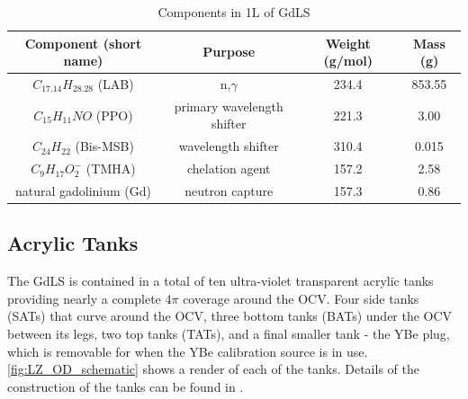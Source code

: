 \begin{table}
    \centering
    \begin{tabular}{c | c | c | c}
    \hline
    {Component (short name)} & {Purpose} & {Weight (g/mol)} & {Mass (g)} \\ \hline
    $C_{17.14}H_{28.28}$ (LAB) & n,$\gamma$ & 234.4  & 853.55 \\
    $C_{15}H_{11}NO$ (PPO) & primary wavelength shifter & 221.3 & 3.00 \\
    $C_{24}H_{22}$ (Bis-MSB) & wavelength shifter & 310.4 & 0.015 \\
    $C_{9}H_{17}O^{-}_{2}$ (TMHA) & chelation agent & 157.2 & 2.58 \\
    natural gadolinium (Gd) & neutron capture & 157.3 & 0.86 
    \end{tabular}
    \caption{Components in 1L of GdLS}
    \label{tab:GdLS_Components}
\end{table} 


\subsection{Acrylic Tanks}
\par
The GdLS is contained in a total of ten ultra-violet transparent acrylic tanks providing nearly a complete 4$\pi$ coverage around the OCV.
Four side tanks (SATs) that curve around the OCV, three bottom tanks (BATs) under the OCV between its legs, two top tanks (TATs), and a final smaller tank - the YBe plug, which is removable for when the YBe calibration source is in use.
\autoref{fig:LZ_OD_schematic} shows a render of each of the tanks.
Details of the construction of the tanks can be found in \cite{scotthaselschwardt_thesis_ref}.

